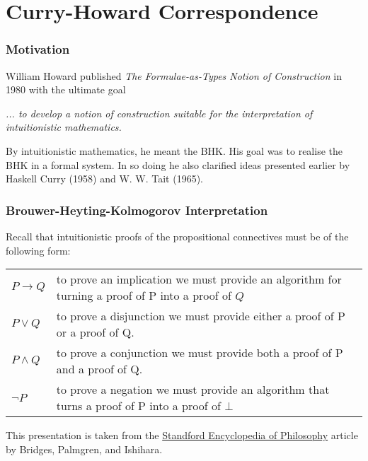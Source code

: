 \documentclass{beamer}
\theoremstyle{indentDefn} \newtheorem{defn}[]{Definition}
\begin{document}
\section{Curry-Howard Correspondence}

\begin{frame}
  \frametitle{Motivation}

  William Howard published \emph{The Formulae-as-Types Notion of Construction} in 1980 with the ultimate goal

  \emph{... to develop a notion of construction suitable for the interpretation of intuitionistic mathematics.}

  By intuitionistic mathematics, he meant the BHK. His goal was to realise the BHK in a formal system. In so doing he also clarified ideas presented earlier by Haskell Curry (1958) and W. W. Tait (1965).
  
  \vspace{40mm}

\end{frame}

\begin{frame}
  \frametitle{Brouwer-Heyting-Kolmogorov Interpretation}

  Recall that intuitionistic proofs of the propositional connectives must be of the following form: 

  \vspace{0.5cm}

  \begin{center}
    \begin{tabular}{p{1.5cm}p{8cm}}
      $P \to Q$ & to prove an implication we must provide an algorithm for turning a proof of P into a proof of $Q$\\
      $P \lor Q$ & to prove a disjunction we must provide either a proof of P or a proof of Q. \\
      $P \land Q$ & to prove a conjunction we must provide both a proof of P and a proof of Q. \\
      $\lnot P$ &  to prove a negation we must provide an algorithm that turns a proof of P into a proof of $\bot$ 
    \end{tabular}
  \end{center}

  \vspace{0.5cm}

  This presentation is taken from the \href{https://plato.stanford.edu/entries/mathematics-constructive/}{Standford Encyclopedia of Philosophy} article by Bridges, Palmgren, and Ishihara.
\end{frame}
\end{document}
